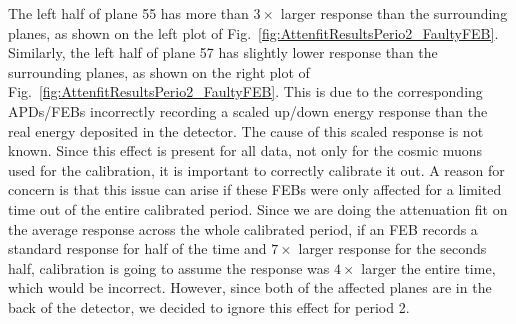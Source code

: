 The left half of plane 55 has more than $3\times$ larger response than the surrounding planes, as shown on the left plot of Fig.~\ref{fig:AttenfitResultsPerio2_FaultyFEB}. Similarly, the left half of plane 57 has slightly lower response than the surrounding planes, as shown on the right plot of Fig.~\ref{fig:AttenfitResultsPerio2_FaultyFEB}. This is due to the corresponding \gls{APD}s/\gls{FEB}s incorrectly recording a scaled up/down energy response than the real energy deposited in the detector. The cause of this scaled response is not known. Since this effect is present for all data, not only for the cosmic muons used for the calibration, it is important to correctly calibrate it out. A reason for concern is that this issue can arise if these \gls{FEB}s were only affected for a limited time out of the entire calibrated period. Since we are doing the attenuation fit on the average response across the whole calibrated period, if an \gls{FEB} records a standard response for half of the time and $7\times$ larger response for the seconds half, calibration is going to assume the response was $4\times$ larger the entire time, which would be incorrect. However, since both of the affected planes are in the back of the detector, we decided to ignore this effect for period 2.


